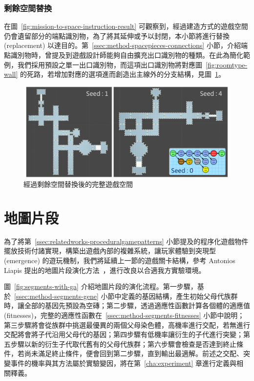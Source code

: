 \subsubsection{剩餘空間替換}
\label{sssec:method-spacepieces-frommissiontospace-replacement}

在圖~\ref{fig:mission-to-space-instruction-result} 可觀察到，經過建造方式的遊戲空間仍會遺留部分的端點識別物，為了將其延伸或予以封閉，本小節將進行替換 (replacement) 以達目的。第~\ref{ssec:method-spacepieces-connections} 小節，介紹端點識別物時，曾提及到遊戲設計師能夠自由擴充出口識別物的種類。在此為簡化範例，我們採用預設之單一出口識別物，而這項出口識別物將對應圖~\ref{fig:roomtype-wall} 的死路，若增加對應的選項進而創造出主線外的分支結構，見圖~\ref{fig:mission-to-space-replacement-result}。

\begin{figure}[ht]
  \begin{center}
    \includegraphics[width=1.0\textwidth]{figures/mission-to-space-replacement-result.png}
    \caption{經過剩餘空間替換後的完整遊戲空間} 
    \label{fig:mission-to-space-replacement-result}
  \end{center}
\end{figure}

\clearpage

\section{地圖片段}
\label{sec:method-segments}

為了將第~\ref{ssec:relatedworks-proceduralgamepatterns} 小節提及的程序化遊戲物件擺放技術付諸實現，構築出遊戲內部的複雜系統，讓玩家體驗到突現型 (emergence) 的遊玩機制，我們將延續上一節的遊戲關卡結構，參考 Antonios Liapis 提出的地圖片段演化方法~\cite{liapis2017multi}，進行改良以合適我方實驗環境。

圖~\ref{fig:segments-with-ga} 介紹地圖片段的演化流程。第一步驟，基於~\ref{ssec:method-segments-gene} 小節中定義的基因結構，產生初始父母代族群時，讓全部的基因先預設為空磚；第二步驟，透過適應性函數計算各個體的適應值 (fitnesses)，完整的適應性函數在~\ref{ssec:method-segments-fitnesses} 小節中說明；第三步驟將會從族群中挑選最優異的兩個父母染色體，高機率進行交配，若無進行交配將會將子代沿用父母代的基因；第四步驟有低機率讓衍生的子代進行突變；第五步驟以新的衍生子代取代舊有的父母代族群；第六步驟會檢查是否達到終止條件，若尚未滿足終止條件，便會回到第二步驟，直到輸出最適解。前述之交配、突變事件的機率與其方法屬於實驗變因，將在第~\ref{cha:experiment} 章進行定義與相關釋義。

